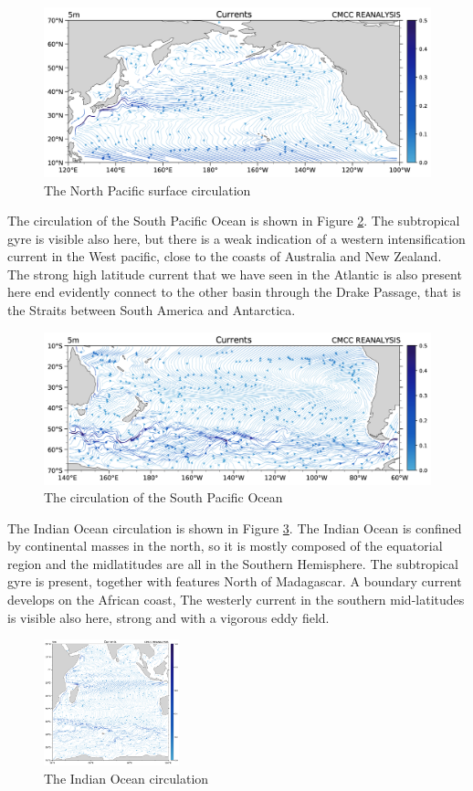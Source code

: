 \begin{figure}[htpb]
	\centering
	\includegraphics[width = 0.4 \textwidth]{uploads/i36mage.png}
	\caption{The North Pacific surface circulation} \label{fig:fig11}
\end{figure}

The circulation of the South Pacific Ocean is shown in Figure \ref{fig:fig12}. The subtropical gyre is visible also here, but there is a weak indication of a western intensification current in the West pacific, close to the coasts of Australia and New Zealand. The strong high latitude current that we have seen in the Atlantic is also present here end evidently connect to the other basin through the Drake Passage, that is the Straits between South America and Antarctica.

\begin{figure}[htpb]
	\centering
	\includegraphics[width = 0.5 \textwidth]{uploads/37image.png}
	\caption{The circulation of the South Pacific Ocean} \label{fig:fig12}
\end{figure}

The Indian Ocean circulation is shown in Figure \ref{fig:fig13}. The Indian Ocean is confined by continental masses in the north, so it is mostly composed of the equatorial region and the midlatitudes are all in the Southern Hemisphere. The subtropical gyre is present, together with features North of Madagascar. A boundary current develops on the African coast, The westerly current in the southern mid-latitudes is visible also here, strong and with a vigorous eddy field.

\begin{figure}[htpb]
	\centering
	\includegraphics[width = 0.35\textwidth]{uploads/38image.png}
	\caption{The Indian Ocean circulation} \label{fig:fig13}
\end{figure}

